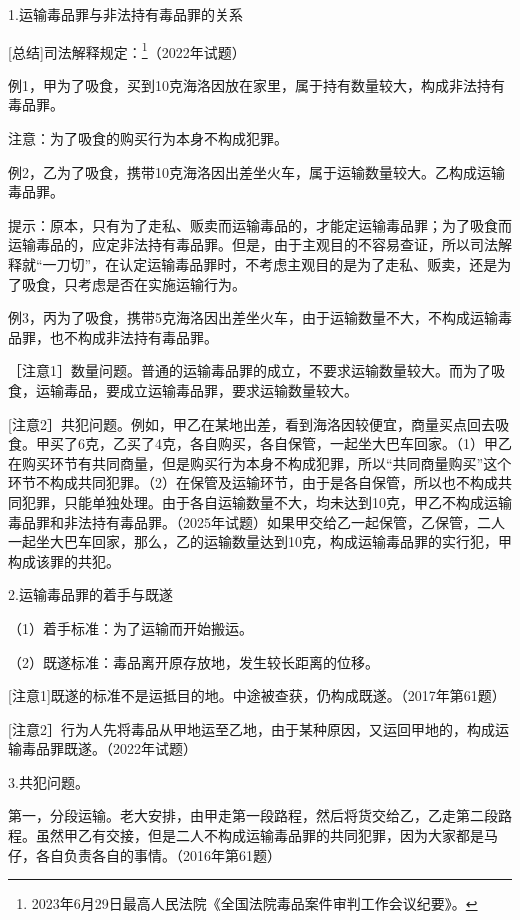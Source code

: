 1.运输毒品罪与非法持有毒品罪的关系

[总结]司法解释规定：\footnote{2023年6月29日最高人民法院《全国法院毒品案件审判工作会议纪要》。}（2022年试题）


例1，甲为了吸食，买到10克海洛因放在家里，属于持有数量较大，构成非法持有毒品罪。

注意：为了吸食的购买行为本身不构成犯罪。

例2，乙为了吸食，携带10克海洛因出差坐火车，属于运输数量较大。乙构成运输毒品罪。

提示：原本，只有为了走私、贩卖而运输毒品的，才能定运输毒品罪；为了吸食而运输毒品的，应定非法持有毒品罪。但是，由于主观目的不容易查证，所以司法解释就“一刀切”，在认定运输毒品罪时，不考虑主观目的是为了走私、贩卖，还是为了吸食，只考虑是否在实施运输行为。

例3，丙为了吸食，携带5克海洛因出差坐火车，由于运输数量不大，不构成运输毒品罪，也不构成非法持有毒品罪。

［注意1］数量问题。普通的运输毒品罪的成立，不要求运输数量较大。而为了吸食，运输毒品，要成立运输毒品罪，要求运输数量较大。

[注意2］共犯问题。例如，甲乙在某地出差，看到海洛因较便宜，商量买点回去吸食。甲买了6克，乙买了4克，各自购买，各自保管，一起坐大巴车回家。（1）甲乙在购买环节有共同商量，但是购买行为本身不构成犯罪，所以“共同商量购买”这个环节不构成共同犯罪。（2）在保管及运输环节，由于是各自保管，所以也不构成共同犯罪，只能单独处理。由于各自运输数量不大，均未达到10克，甲乙不构成运输毒品罪和非法持有毒品罪。（2025年试题）如果甲交给乙一起保管，乙保管，二人一起坐大巴车回家，那么，乙的运输数量达到10克，构成运输毒品罪的实行犯，甲构成该罪的共犯。

2.运输毒品罪的着手与既遂

（1）着手标准：为了运输而开始搬运。

（2）既遂标准：毒品离开原存放地，发生较长距离的位移。

[注意1]既遂的标准不是运抵目的地。中途被查获，仍构成既遂。（2017年第61题）

[注意2］行为人先将毒品从甲地运至乙地，由于某种原因，又运回甲地的，构成运输毒品罪既遂。（2022年试题）

3.共犯问题。

第一，分段运输。老大安排，由甲走第一段路程，然后将货交给乙，乙走第二段路程。虽然甲乙有交接，但是二人不构成运输毒品罪的共同犯罪，因为大家都是马仔，各自负责各自的事情。（2016年第61题）

